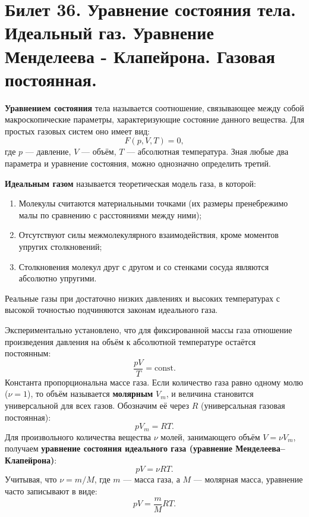 \section{Билет 36. Уравнение состояния тела. Идеальный газ. Уравнение Менделеева - Клапейрона. Газовая постоянная.}

\begin{definition}
\textbf{Уравнением состояния} тела называется соотношение, связывающее между собой макроскопические параметры, характеризующие состояние данного вещества. Для простых газовых систем оно имеет вид:
\begin{equation}
    F(p, V, T) = 0, \label{eq:state_general_36}
\end{equation}
где $p$ --- давление, $V$ --- объём, $T$ --- абсолютная температура. Зная любые два параметра и уравнение состояния, можно однозначно определить третий.
\end{definition}

\begin{definition}
\textbf{Идеальным газом} называется теоретическая модель газа, в которой:
\begin{enumerate}
    \item Молекулы считаются материальными точками (их размеры пренебрежимо малы по сравнению с расстояниями между ними);
    \item Отсутствуют силы межмолекулярного взаимодействия, кроме моментов упругих столкновений;
    \item Столкновения молекул друг с другом и со стенками сосуда являются абсолютно упругими.
\end{enumerate}
Реальные газы при достаточно низких давлениях и высоких температурах с высокой точностью подчиняются законам идеального газа.
\end{definition}

\begin{theorem}
Экспериментально установлено, что для фиксированной массы газа отношение произведения давления на объём к абсолютной температуре остаётся постоянным:
\begin{equation}
    \frac{pV}{T} = \text{const}. \label{eq:combined_gas_36}
\end{equation}
Константа пропорциональна массе газа. Если количество газа равно одному молю ($\nu = 1$), то объём называется \textbf{молярным} $V_m$, и величина становится универсальной для всех газов. Обозначим её через $R$ (универсальная газовая постоянная):
\begin{equation}
    p V_m = R T.
\end{equation}
Для произвольного количества вещества $\nu$ молей, занимающего объём $V = \nu V_m$, получаем \textbf{уравнение состояния идеального газа (уравнение Менделеева--Клапейрона)}:
\begin{equation}
    pV = \nu R T. \label{eq:men_clap_36}
\end{equation}
Учитывая, что $\nu = m/M$, где $m$ --- масса газа, а $M$ --- молярная масса, уравнение часто записывают в виде:
\begin{equation}
    pV = \frac{m}{M} R T.
\end{equation}
\end{theorem}

